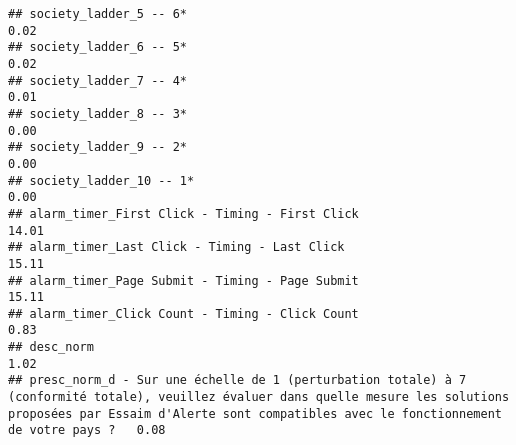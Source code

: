 \documentclass[
]{article}
\begin{document}
\begin{verbatim}
## society_ladder_5 -- 6*                                                                                                                                                                                                       0.02
## society_ladder_6 -- 5*                                                                                                                                                                                                       0.02
## society_ladder_7 -- 4*                                                                                                                                                                                                       0.01
## society_ladder_8 -- 3*                                                                                                                                                                                                       0.00
## society_ladder_9 -- 2*                                                                                                                                                                                                       0.00
## society_ladder_10 -- 1*                                                                                                                                                                                                      0.00
## alarm_timer_First Click - Timing - First Click                                                                                                                                                                              14.01
## alarm_timer_Last Click - Timing - Last Click                                                                                                                                                                                15.11
## alarm_timer_Page Submit - Timing - Page Submit                                                                                                                                                                              15.11
## alarm_timer_Click Count - Timing - Click Count                                                                                                                                                                               0.83
## desc_norm                                                                                                                                                                                                                    1.02
## presc_norm_d - Sur une échelle de 1 (perturbation totale) à 7 (conformité totale), veuillez évaluer dans quelle mesure les solutions proposées par Essaim d'Alerte sont compatibles avec le fonctionnement de votre pays ?   0.08

\end{verbatim}
\end{document}
